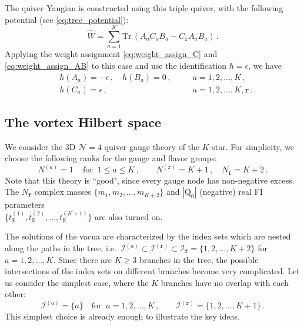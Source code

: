 \documentclass[12pt,a4paper]{article}
\renewcommand{\(}{\left(}
\renewcommand{\)}{\right)}
\renewcommand{\(}{\left(}
\renewcommand{\)}{\right)}
\begin{document}
The quiver Yangian is constructed using this triple quiver, with the following potential (see \eqref{eq:tree_potential}): 
\begin{equation}
\widehat{W}=\sum_{a=1}^{K}\mathrm{Tr}\,(A_aC_aB_a-C_{\mathtt{r}}A_aB_a)\,.
\end{equation}
Applying the weight assignment \eqref{eq:weight_assign_C} and \eqref{eq:weight_assign_AB} to this case and use the identification $\hbar=\epsilon$, we have
\begin{equation}
\begin{aligned}
&h(A_a)=-\epsilon\,,\quad h(B_a)=0\,,\quad &&a=1,2,\dots,K\,,\\
&h(C_a)=\epsilon\,,&& a=1,2,\dots,K,\mathtt{r}\,.
\end{aligned}
\end{equation}


\subsection{The vortex Hilbert space}
We consider the 3D $\mathcal{N}=4$ quiver gauge theory of the $K$-star. 
For simplicity, we choose the following ranks for the gauge and flavor groups:
\begin{equation}
N^{(a)}=1\,\quad\text{for }\  1\leq a \leq K\,, \qquad
N^{(\mathtt{r})}=K+1\,,\quad N_{\mathtt{f}}=K+2\,.
\end{equation} 
Note that this theory is ``good", since every gauge node has non-negative excess. 
The $N_{\mathtt{f}}$ complex masses $\{m_1,m_2,\dots,m_{K+2}\}$ and $|\textrm{Q}_0|$ (negative) real FI parameters\\ $\{t_{\mathbb{R}}^{(1)},t_{\mathbb{R}}^{(2)},\dots,t_{\mathbb{R}}^{(K+1)}\}$ are also turned on.

\medskip

The solutions of the vacua are characterized by the index sets which are nested along the paths in the tree, i.e.\ $\mathcal{I}^{(a)}\subset \mathcal{I}^{(\mathtt{r})}\subset\mathcal{I}_{\mathtt{f}}=\{1,2,\dots,K+2\}$ for $a=1,2,\dots,K$. 
Since there are $K\geq3$ branches in the tree, the possible intersections of the index sets on different branches become very complicated. 
Let us consider the simplest case, where the $K$ branches have no overlap with each other:
\begin{equation}\label{eq:kleaf_vacuum}
\mathcal{I}^{(a)}=\{a\}\quad\text{for }\ a=1,2,\dots,K\,, \qquad 
\mathcal{I}^{(\mathtt{r})}=\{1,2,\dots,K+1\}\,.
\end{equation}
This simplest choice is already enough to illustrate the key ideas.
\end{document}
